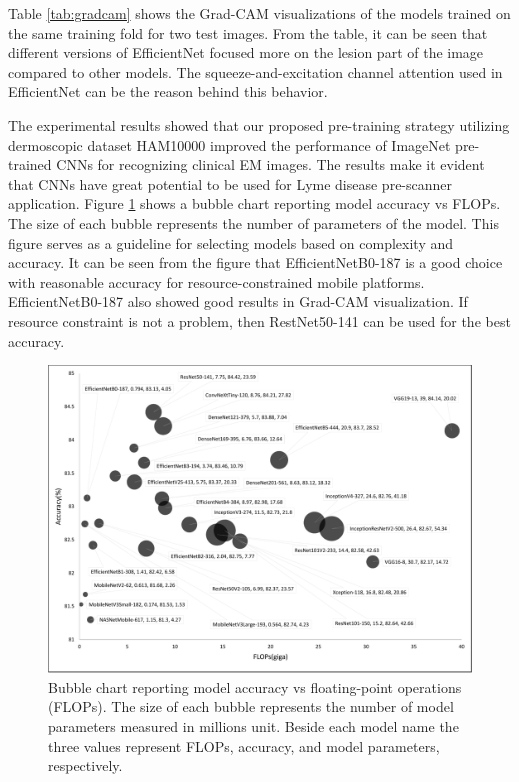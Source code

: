Table \ref{tab:gradcam} shows the Grad-CAM visualizations of the models trained on the same training fold for two test images. From the table, it can be seen that different versions of EfficientNet focused more on the lesion part of the image compared to other models. The squeeze-and-excitation \cite{Hu2020} channel attention used in EfficientNet can be the reason behind this behavior.

The experimental results showed that our proposed pre-training strategy utilizing dermoscopic dataset HAM10000 improved the performance of ImageNet pre-trained CNNs for recognizing clinical EM images. The results make it evident that CNNs have great potential to be used for Lyme disease pre-scanner application. Figure \ref{fig:bubble_chart} shows a bubble chart reporting model accuracy vs FLOPs. The size of each bubble represents the number of parameters of the model. This figure serves as a guideline for selecting models based on complexity and accuracy. It can be seen from the figure that EfficientNetB0-187 is a good choice with reasonable accuracy for resource-constrained mobile platforms. EfficientNetB0-187 also showed good results in Grad-CAM visualization. If resource constraint is not a problem, then RestNet50-141 can be used for the best accuracy.
\begin{figure}[h!]
	\centering
	\includegraphics[width=\textwidth,keepaspectratio]{images/pretraining/bubble-chart-cropped.pdf}
	\caption[Bubble chart reporting model accuracy vs floating-point operations]{Bubble chart reporting model accuracy vs floating-point operations (FLOPs). The size of each bubble represents the number of model parameters measured in millions unit. Beside each model name the three values represent FLOPs, accuracy, and model parameters, respectively.}
	\label{fig:bubble_chart}
\end{figure}

